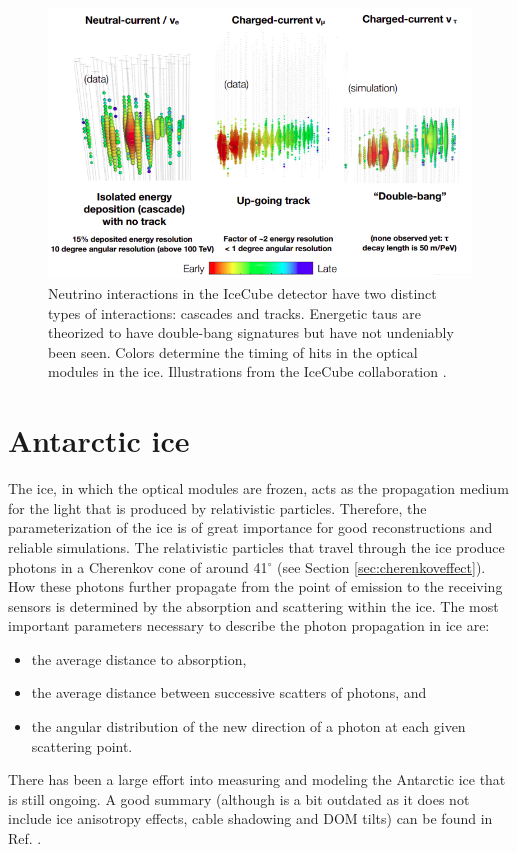 \begin{figure}
\centering
\includegraphics[width=\textwidth]{chapter4/img/ICinteractions2.png}
\caption{Neutrino interactions in the IceCube detector have two distinct types of interactions: cascades and tracks. Energetic taus are theorized to have double-bang signatures but have not undeniably been seen. Colors determine the timing of hits in the optical modules in the ice. Illustrations from the IceCube collaboration \cite{kjeroSignatures}.}
\label{fig:ICinteractions2}
\end{figure}



\section{Antarctic ice}
\label{sec:ice}
The ice, in which the optical modules are frozen, acts as the propagation medium for the light that is produced by relativistic particles. Therefore, the parameterization of the ice is of great importance for good reconstructions and reliable simulations. The relativistic particles that travel through the ice produce photons in a Cherenkov cone of around 41$^\circ$ (see Section \ref{sec:cherenkoveffect}). How these photons further propagate from the point of emission to the receiving sensors is determined by the absorption and scattering within the ice. The most important parameters necessary to describe the photon propagation in ice are:
\vspace{2mm}
\begin{itemize}
\item the average distance to absorption,
\item the average distance between successive scatters of photons, and 
\item the angular distribution of the new direction of a photon at each given scattering point.
\end{itemize}
\vspace{2mm}
There has been a large effort into measuring and modeling the Antarctic ice that is still ongoing. A good summary (although is a bit outdated as it does not include ice anisotropy effects, cable shadowing and DOM tilts) can be found in Ref. \cite{Aartsen:2013rt}.

